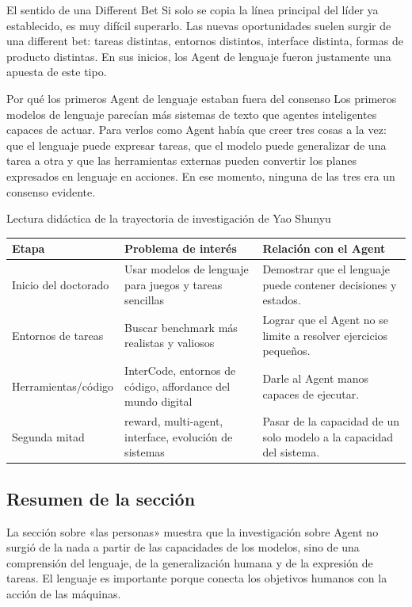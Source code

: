 \begin{importantbox}{El sentido de una Different Bet}
Si solo se copia la línea principal del líder ya establecido, es muy difícil superarlo. Las nuevas oportunidades suelen surgir de una different bet: tareas distintas, entornos distintos, interface distinta, formas de producto distintas. En sus inicios, los Agent de lenguaje fueron justamente una apuesta de este tipo.
\end{importantbox}

\begin{knowledgebox}{Por qué los primeros Agent de lenguaje estaban fuera del consenso}
Los primeros modelos de lenguaje parecían más sistemas de texto que agentes inteligentes capaces de actuar. Para verlos como Agent había que creer tres cosas a la vez: que el lenguaje puede expresar tareas, que el modelo puede generalizar de una tarea a otra y que las herramientas externas pueden convertir los planes expresados en lenguaje en acciones. En ese momento, ninguna de las tres era un consenso evidente.
\end{knowledgebox}

\begin{knowledgebox}{Lectura didáctica de la trayectoria de investigación de Yao Shunyu}
\begin{tabularx}{\textwidth}{p{}p{}X}
\toprule
Etapa & Problema de interés & Relación con el Agent \\
\midrule
Inicio del doctorado & Usar modelos de lenguaje para juegos y tareas sencillas & Demostrar que el lenguaje puede contener decisiones y estados. \\
Entornos de tareas & Buscar benchmark más realistas y valiosos & Lograr que el Agent no se limite a resolver ejercicios pequeños. \\
Herramientas/código & InterCode, entornos de código, affordance del mundo digital & Darle al Agent manos capaces de ejecutar. \\
Segunda mitad & reward, multi-agent, interface, evolución de sistemas & Pasar de la capacidad de un solo modelo a la capacidad del sistema. \\
\bottomrule
\end{tabularx}
\end{knowledgebox}

\subsection{Resumen de la sección}

La sección sobre «las personas» muestra que la investigación sobre Agent no surgió de la nada a partir de las capacidades de los modelos, sino de una comprensión del lenguaje, de la generalización humana y de la expresión de tareas. El lenguaje es importante porque conecta los objetivos humanos con la acción de las máquinas.
